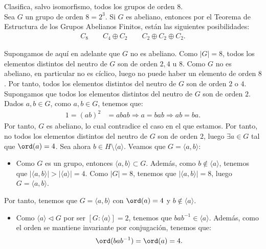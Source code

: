 \newpage
\begin{ejercicio}
    Clasifica, salvo isomorfismo, todos los grupos de orden \(8\).\\

    Sea $G$ un grupo de orden \(8=2^3\). Si $G$ es abeliano, entonces por el Teorema de Estructura de los Grupos Abelianos Finitos, están las siguientes posibilidades:
    \begin{gather*}
        C_8 \qquad C_4\oplus C_2 \qquad C_2\oplus C_2\oplus C_2.
    \end{gather*}

    Supongamos de aquí en adelante que \(G\) no es abeliano. Como $|G|=8$, todos los elementos distintos del neutro de \(G\) son de orden \(2, 4\) u \(8\). Como \(G\) no es abeliano, en particular no es cíclico, luego no puede haber un elemento de orden \(8\). Por tanto, todos los elementos distintos del neutro de \(G\) son de orden \(2\) o \(4\).\\

    Supongamos que todos los elementos distintos del neutro de \(G\) son de orden \(2\). Dados $a,b\in G$, como $a,b\in G$, tenemos que:
    \begin{align*}
        1 = (ab)^2 &= abab
        \Longrightarrow
        a=bab\Longrightarrow
        ab = ba.
    \end{align*}
    Por tanto, \(G\) es abeliano, lo cual contradice el caso en el que estamos. Por tanto, no todos los elementos distintos del neutro de \(G\) son de orden \(2\), luego $\exists a\in G$ tal que \(\ord(a) = 4\). Sea ahora $b\in H\setminus \langle a\rangle$. Veamos que $G=\langle a, b\rangle$:
    \begin{itemize}
        \item Como $G$ es un grupo, entonces $\langle a, b\rangle \subset G$. Además, como $b\notin \langle a\rangle$, tenemos que $|\langle a, b\rangle|>|\langle a\rangle|=4$. Como \(|G|=8\), tenemos que \(|\langle a, b\rangle| = 8\), luego \(G=\langle a, b\rangle\).
    \end{itemize}

    Por tanto, tenemos que $G=\langle a, b\rangle$ con \(\ord(a) = 4\) y \(b\notin \langle a\rangle\).
    \begin{itemize}
        \item Como $\langle a\rangle\lhd G$ por ser $[G:\langle a\rangle]=2$, tenemos que \(ba b^{-1}\in \langle a\rangle\). Además, como el orden se mantiene invariante por conjugación, tenemos que:
        \begin{equation*}
            \ord(ba b^{-1}) = \ord(a) = 4.
        \end{equation*}


\end{itemize}
\end{ejercicio}
